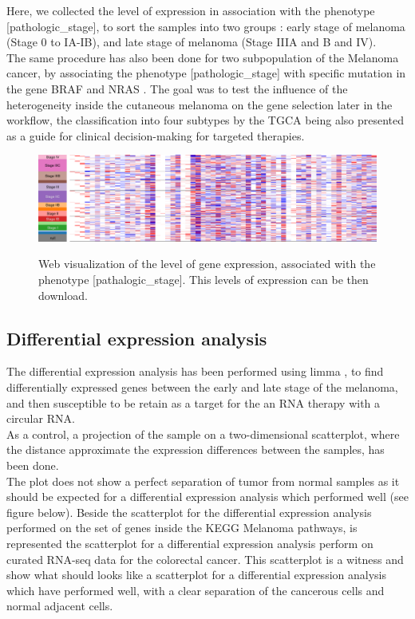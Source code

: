 \documentclass[a4paper,12pt]{report}
\begin{document}
Here, we collected the level of expression in association with the phenotype [pathologic\_stage], to sort the samples into two groups : early stage of melanoma (Stage 0 to IA-IB), and late stage of melanoma (Stage IIIA and B and IV)\cite{joint}. \\

The same procedure has also been done for two subpopulation of the Melanoma cancer\cite{TGCA}, by associating the phenotype [pathologic\_stage] with specific mutation in the gene BRAF and NRAS \cite{TGCA}. The goal was to test the influence of the heterogeneity inside the cutaneous melanoma on the gene selection later in the workflow, the classification into four subtypes by the TGCA being also presented as a guide for clinical decision-making for targeted therapies\cite{TGCA}.

\begin{figure}[H]
	\centering
	{\includegraphics[width=1\textwidth]{Xena_melanoma.pdf}}
	\caption{Web visualization of the level of gene expression, associated with the phenotype [pathalogic\_stage]. This levels of expression can be then download.}
\end{figure}


\subsection{Differential expression analysis}

The differential expression analysis has been performed using limma \cite{limma}, to find differentially expressed genes between the early and late stage of the melanoma, and then susceptible to be retain as a target for the an RNA therapy with a circular RNA.\\

As a control, a projection of the sample on a two-dimensional scatterplot, where the distance approximate the expression differences between the samples, has been done.\\

The plot does not show a perfect separation of tumor from normal samples as it should be expected for a differential expression analysis which performed well (see figure below). Beside the scatterplot for the differential expression analysis performed on the set of genes inside the KEGG Melanoma pathways, is represented the scatterplot for a differential expression analysis perform on curated RNA-seq data for the colorectal cancer\cite{curated}. This scatterplot is a witness and show what should looks like a scatterplot for a differential expression analysis which have performed well, with a clear separation of the cancerous cells and normal adjacent cells.\\
\end{document}
